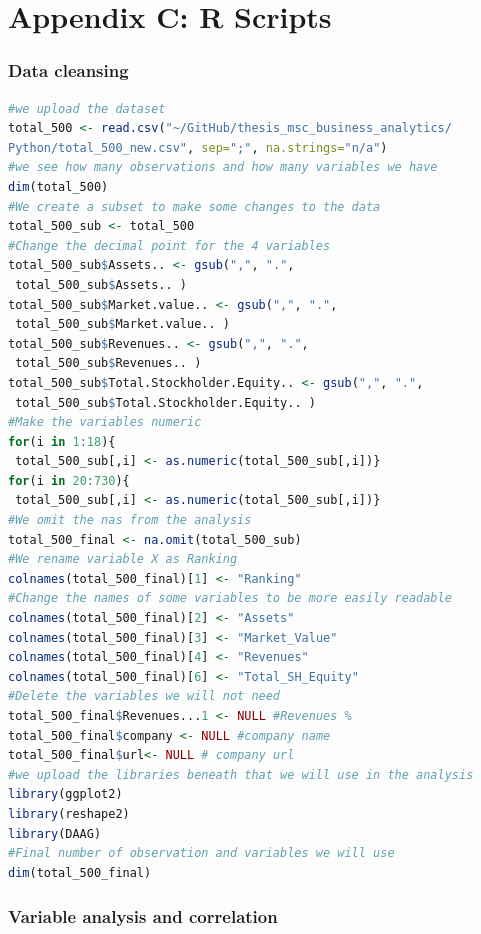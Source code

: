 \documentclass{article}
\begin{document}
\section{Appendix C: R Scripts} \label{appP}
\subsubsection{Data cleansing}\label{r:data cleansing}
\begin{lstlisting}[language=R]
#we upload the dataset
total_500 <- read.csv("~/GitHub/thesis_msc_business_analytics/
Python/total_500_new.csv", sep=";", na.strings="n/a")
#we see how many observations and how many variables we have
dim(total_500)
#We create a subset to make some changes to the data
total_500_sub <- total_500
#Change the decimal point for the 4 variables
total_500_sub$Assets.. <- gsub(",", ".",
 total_500_sub$Assets.. )
total_500_sub$Market.value.. <- gsub(",", ".",
 total_500_sub$Market.value.. )
total_500_sub$Revenues.. <- gsub(",", ".",
 total_500_sub$Revenues.. )
total_500_sub$Total.Stockholder.Equity.. <- gsub(",", ".",
 total_500_sub$Total.Stockholder.Equity.. )
#Make the variables numeric
for(i in 1:18){
 total_500_sub[,i] <- as.numeric(total_500_sub[,i])}  
for(i in 20:730){
 total_500_sub[,i] <- as.numeric(total_500_sub[,i])} 
#We omit the nas from the analysis
total_500_final <- na.omit(total_500_sub)
#We rename variable X as Ranking
colnames(total_500_final)[1] <- "Ranking"
#Change the names of some variables to be more easily readable
colnames(total_500_final)[2] <- "Assets"
colnames(total_500_final)[3] <- "Market_Value"
colnames(total_500_final)[4] <- "Revenues"
colnames(total_500_final)[6] <- "Total_SH_Equity"
#Delete the variables we will not need
total_500_final$Revenues...1 <- NULL #Revenues %
total_500_final$company <- NULL #company name
total_500_final$url<- NULL # company url
#we upload the libraries beneath that we will use in the analysis
library(ggplot2)
library(reshape2)
library(DAAG)
#Final number of observation and variables we will use
dim(total_500_final)
\end{lstlisting}

\subsubsection{Variable analysis and correlation}
\end{document}
